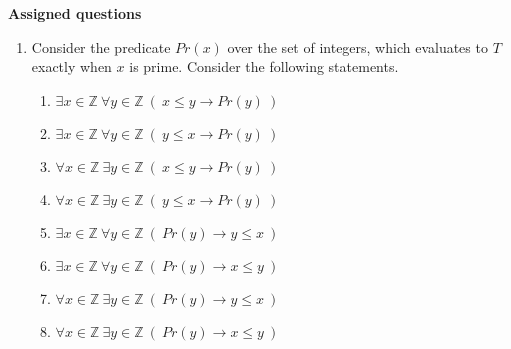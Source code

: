 \documentclass[12pt, oneside]{article}
\begin{document}
{\bf Assigned questions}

\begin{enumerate}
   \item Consider the predicate $Pr(x)$ over the set of integers, which evaluates to $T$ exactly when 
   $x$ is prime. Consider the following statements.
   
    \begin{multicols}{2}
    \begin{enumerate}[label=(\roman*)]
        \item $\exists x \in \mathbb{Z}~ \forall y \in \mathbb{Z}~(~x \leq y \to Pr(y)~)$
        \item $\exists x \in \mathbb{Z}~ \forall y \in \mathbb{Z}~(~y \leq x \to Pr(y)~)$
        \item $\forall x \in \mathbb{Z}~ \exists y \in \mathbb{Z}~(~x \leq y \to Pr(y)~)$
        \item $\forall x \in \mathbb{Z}~ \exists y \in \mathbb{Z}~(~y \leq x \to Pr(y)~)$
        \item $\exists x \in \mathbb{Z}~ \forall y \in \mathbb{Z}~(~Pr(y) \to y \leq x~)$
        \item $\exists x \in \mathbb{Z}~ \forall y \in \mathbb{Z}~(~Pr(y) \to x \leq y~)$
        \item $\forall x \in \mathbb{Z}~ \exists y \in \mathbb{Z}~(~Pr(y) \to y \leq x~)$
        \item $\forall x \in \mathbb{Z}~ \exists y \in \mathbb{Z}~(~Pr(y) \to x \leq y~)$
    \end{enumerate}
    \end{multicols}
   
   \begin{enumerate}
   

\end{enumerate}
\end{enumerate}
\end{document}
